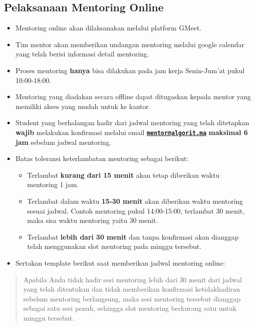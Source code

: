\documentclass[
]{book}
\providecommand{\tightlist}{%
  \setlength{\itemsep}{0pt}\setlength{\parskip}{0pt}}
\begin{document}
\hypertarget{pelaksanaan-mentoring-online}{%
\subsection{Pelaksanaan Mentoring Online}\label{pelaksanaan-mentoring-online}}

\begin{itemize}
\item
  Mentoring online akan dilaksanakan melalui platform GMeet.
\item
  Tim mentor akan memberikan undangan mentoring melalui google calendar yang telah berisi informasi detail mentoring.
\item
  Proses mentoring \textbf{hanya} bisa dilakukan pada jam kerja Senin-Jum'at pukul 10:00-18:00.
\item
  Mentoring yang diadakan secara offline dapat ditugaskan kepada mentor yang memiliki akses yang mudah untuk ke kantor.
\item
  Student yang berhalangan hadir dari jadwal mentoring yang telah ditetapkan \textbf{wajib} melakukan konfirmasi melalui email \textbf{\href{mailto:mentor@algorit.ma}{\nolinkurl{mentor@algorit.ma}}} \textbf{maksimal 6 jam} sebelum jadwal mentoring.
\item
  Batas toleransi keterlambatan mentoring sebagai berikut:

  \begin{itemize}
  \tightlist
  \item
    Terlambat \textbf{kurang dari 15 menit} akan tetap diberikan waktu mentoring 1 jam.
  \item
    Terlambat dalam waktu \textbf{15-30 menit} akan diberikan waktu mentoring sesuai jadwal. Contoh mentoring pukul 14:00-15:00, terlambat 30 menit, maka sisa waktu mentoring yaitu 30 menit.
  \item
    Terlambat \textbf{lebih dari 30 menit} dan tanpa konfirmasi akan dianggap telah menggunakan slot mentoring pada minggu tersebut.
  \end{itemize}
\item
  Sertakan template berikut saat memberikan jadwal mentoring online:
\end{itemize}

\begin{quote}
Apabila Anda tidak hadir sesi mentoring lebih dari 30 menit dari jadwal yang telah ditentukan dan tidak memberikan konfirmasi ketidakhadiran sebelum mentoring berlangsung, maka sesi mentoring tersebut dianggap sebagai satu sesi penuh, sehingga slot mentoring berkurang satu untuk minggu tersebut.
\end{quote}
\end{document}
